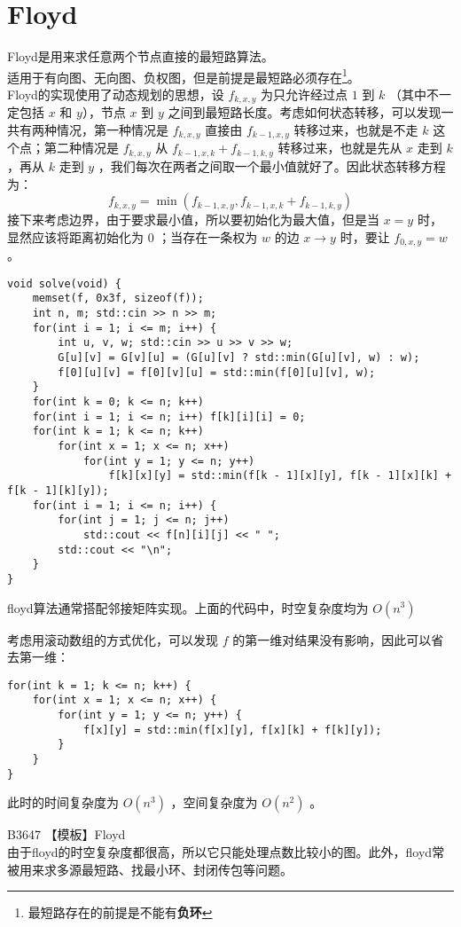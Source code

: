\documentclass{beamer}
\newcommand{\fdf}[1]{\alert{\textbf{#1}}}
\begin{document}
\section{Floyd}
\begin{frame}
Floyd是用来求任意两个节点直接的最短路算法。\\ 
适用于有向图、无向图、负权图，但是前提是最短路必须存在\footnote{最短路存在的前提是不能有\fdf{负环}}。\\ 
Floyd的实现使用了动态规划的思想，设 $f_{k, x, y}$ 为只允许经过点 $1$ 到 $k$ （其中不一定包括 $x$ 和 $y$），节点 $x$ 到 $y$ 之间到最短路长度。考虑如何状态转移，可以发现一共有两种情况，第一种情况是 $f_{k, x, y}$ 直接由 $f_{k - 1, x, y}$ 转移过来，也就是不走 $k$ 这个点；第二种情况是 $f_{k, x, y}$ 从 $f_{k - 1, x, k} + f_{k - 1, k, y}$ 转移过来，也就是先从 $x$ 走到 $k$ ，再从 $k$ 走到 $y$ ，我们每次在两者之间取一个最小值就好了。因此状态转移方程为：
$$f_{k, x, y} = \min(f_{k - 1, x, y}, f_{k - 1, x, k} + f_{k - 1, k, y})$$
接下来考虑边界，由于要求最小值，所以要初始化为最大值，但是当 $x = y$ 时，显然应该将距离初始化为 $0$ ；当存在一条权为 $w$ 的边 $x \rightarrow y$ 时，要让 $f_{0, x, y} = w$。
\end{frame}
\begin{frame}[fragile]
\begin{onlyenv}
\begin{verbatim}
void solve(void) {
    memset(f, 0x3f, sizeof(f));
    int n, m; std::cin >> n >> m;
    for(int i = 1; i <= m; i++) {
        int u, v, w; std::cin >> u >> v >> w;
        G[u][v] = G[v][u] = (G[u][v] ? std::min(G[u][v], w) : w);
        f[0][u][v] = f[0][v][u] = std::min(f[0][u][v], w);
    }
    for(int k = 0; k <= n; k++)
    for(int i = 1; i <= n; i++) f[k][i][i] = 0;
    for(int k = 1; k <= n; k++) 
        for(int x = 1; x <= n; x++) 
            for(int y = 1; y <= n; y++) 
                f[k][x][y] = std::min(f[k - 1][x][y], f[k - 1][x][k] + f[k - 1][k][y]);
    for(int i = 1; i <= n; i++) {
        for(int j = 1; j <= n; j++)
            std::cout << f[n][i][j] << " ";
        std::cout << "\n";
    }
}
\end{verbatim}
\end{onlyenv}
floyd算法通常搭配邻接矩阵实现。上面的代码中，时空复杂度均为 $O(n^3)$
\end{frame}
\begin{frame}[fragile]
考虑用滚动数组的方式优化，可以发现 $f$ 的第一维对结果没有影响，因此可以省去第一维：
\begin{onlyenv}
\begin{verbatim}
for(int k = 1; k <= n; k++) {
    for(int x = 1; x <= n; x++) {
        for(int y = 1; y <= n; y++) {
            f[x][y] = std::min(f[x][y], f[x][k] + f[k][y]);
        }
    }
}
\end{verbatim}
\end{onlyenv}
此时的时间复杂度为 $O(n^3)$ ，空间复杂度为 $O(n^2)$ 。
\end{frame}
\begin{frame}
B3647 【模板】Floyd\\ 
由于floyd的时空复杂度都很高，所以它只能处理点数比较小的图。此外，floyd常被用来求多源最短路、找最小环、封闭传包等问题。
\end{frame}
\end{document}
